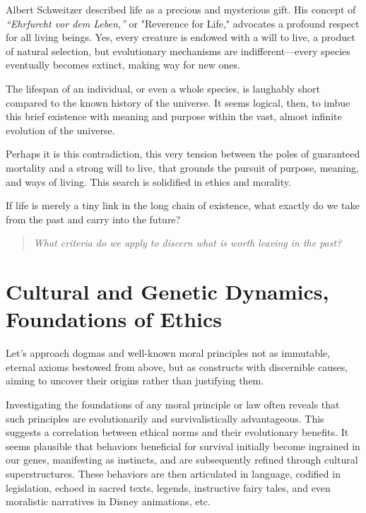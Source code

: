 \documentclass[11pt,a4]{article}
\begin{document}
    Albert Schweitzer described life as a precious and mysterious
    gift\cite{Schweitzer}. His concept of \textit{“Ehrfurcht vor dem Leben,”}
    or "Reverence for Life," advocates a profound respect for all living beings.
    Yes, every creature is endowed with a will to live, a product of
    natural selection, but evolutionary mechanisms are indifferent---every species eventually becomes extinct, making way for new ones.

    The lifespan of an individual, or even a whole species, is
    laughably short compared to the known history of the universe.
    It seems logical, then, to imbue this brief existence with
    meaning and purpose within the vast, almost infinite
    evolution of the universe.

    Perhaps it is this contradiction, this very tension
    between the poles of guaranteed mortality and a
    strong will to live, that grounds the pursuit of
    purpose, meaning, and ways of living. This search
    is solidified in ethics and morality.

    If life is merely a tiny link in the long chain of
    existence, what exactly do we take from the past
    and carry into the future?

    \begin{quote}
        \textit{What criteria
        do we apply to discern what is worth leaving in the past?}
    \end{quote}

\newpage
\section{Cultural and Genetic Dynamics, Foundations of Ethics}

    Let's approach dogmas and well-known moral principles not as
    immutable, eternal axioms bestowed from above, but as constructs
    with discernible causes, aiming to uncover their origins rather than
    justifying them.

    Investigating the foundations of any moral principle or law often
    reveals that such principles are evolutionarily and survivalistically
    advantageous. This suggests a correlation between ethical
    norms and their evolutionary benefits. It seems plausible
    that behaviors beneficial for
    survival initially become ingrained in our genes, manifesting as
    instincts, and are subsequently refined through cultural superstructures.
    These behaviors are then articulated in language,
    codified in legislation, echoed in sacred texts, legends,
    instructive fairy tales, and even moralistic narratives in
    Disney animations, etc.
\end{document}
